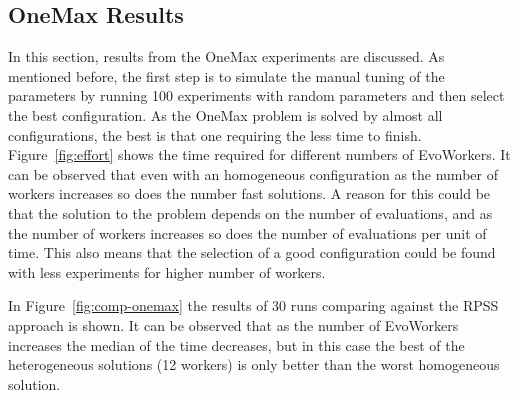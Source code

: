 \documentclass{llncs}
\begin{document}
\subsection{OneMax Results}
In this section, results from the OneMax experiments are discussed. As mentioned before, the first
step is to simulate the manual tuning of the parameters by running 100 experiments with random 
parameters and then select the best configuration. As the OneMax problem is solved by almost 
all configurations, the best is that one requiring the less time to finish. Figure~\ref{fig:effort} 
shows the time required for different numbers of EvoWorkers. It can be observed that even with an 
homogeneous configuration as the number of workers increases so does the number fast solutions.
A reason for this could be that the solution to the problem depends on the number of evaluations, and 
as the number of workers increases so does the number of evaluations per unit of time. This also means
that the selection of a good configuration could be found with less experiments for higher number 
of workers.


In Figure~\ref{fig:comp-onemax} the results of 30 runs comparing against the RPSS approach is shown.
It can be observed that as the number of EvoWorkers increases the median of the time decreases, but
in this case the best of the heterogeneous solutions (12 workers) is only better than the worst homogeneous
solution. 
\end{document}
